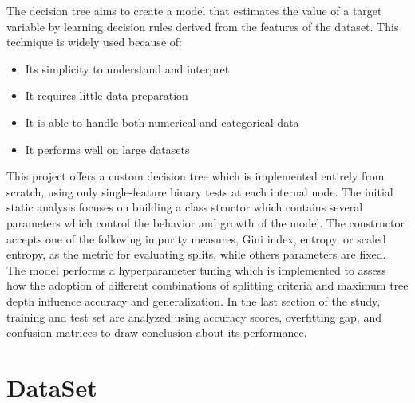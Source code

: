 \documentclass{article}
\begin{document}
The decision tree aims to create a model that estimates the value of a target variable by learning decision rules derived from the features of the dataset. 
This technique is widely used because of:
\begin{itemize}
    \item Its simplicity to understand and interpret
    \item It requires little data preparation
    \item It is able to handle both numerical and categorical data
    \item It performs well on large datasets
\end{itemize}
This project offers a custom decision tree which is implemented entirely from scratch, using only single-feature binary tests at each internal node. The initial static analysis focuses on building a class structor which contains several parameters which control the behavior and growth of the model. The constructor accepts one of the following impurity measures, Gini index, entropy, or scaled entropy, as the metric for evaluating splits, while others parameters are fixed.
The model performs a hyperparameter tuning which is implemented to assess how the adoption of different combinations of splitting criteria and maximum tree depth influence accuracy and generalization. In the last section of the study, training and test set are analyzed using accuracy scores, overfitting gap, and confusion matrices to draw conclusion about its performance.

\section{DataSet}
\end{document}
